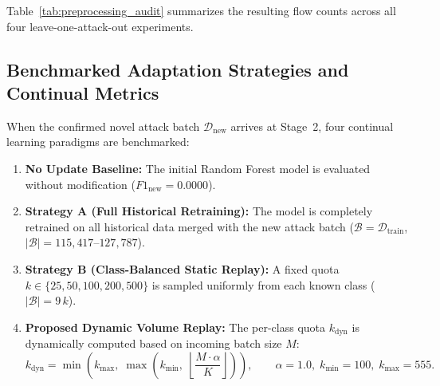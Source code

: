 Table~\ref{tab:preprocessing_audit} summarizes the resulting flow counts across all four leave-one-attack-out experiments.

\begin{table}[htbp]
\centering
\small
\setlength{\tabcolsep}{5pt}
\renewcommand{\arraystretch}{1.25}
\caption{Dataset partitioning and sample counts across the four leave-one-attack-out experiments}
\label{tab:preprocessing_audit}
\end{table}

\subsection{Benchmarked Adaptation Strategies and Continual Metrics}
\label{subsec:strategies_and_metrics}

When the confirmed novel attack batch $\mathcal{D}_{\text{new}}$ arrives at Stage~2, four continual learning paradigms are benchmarked:
\begin{enumerate}
    \item \textbf{No Update Baseline:} The initial Random Forest model is evaluated without modification ($F1_{\text{new}} = 0.0000$).
    \item \textbf{Strategy A (Full Historical Retraining):} The model is completely retrained on all historical data merged with the new attack batch ($\mathcal{B} = \mathcal{D}_{\text{train}}$, $|\mathcal{B}| = 115{,}417\text{--}127{,}787$).
    \item \textbf{Strategy B (Class-Balanced Static Replay):} A fixed quota $k \in \{25, 50, 100, 200, 500\}$ is sampled uniformly from each known class ($|\mathcal{B}| = 9\,k$).
    \item \textbf{Proposed Dynamic Volume Replay:} The per-class quota $k_{\text{dyn}}$ is dynamically computed based on incoming batch size $M$:
    \begin{equation}
    k_{\text{dyn}} = \min\!\left( k_{\max},\; \max\!\left( k_{\min},\; \left\lfloor \frac{M \cdot \alpha}{K} \right\rfloor \right) \right), \qquad \alpha = 1.0, \; k_{\min} = 100, \; k_{\max} = 555.
    \end{equation}
\end{enumerate}

